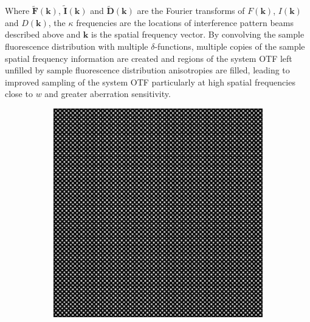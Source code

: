 Where $\tilde{\textbf{F}}(\textbf{k})$, $\tilde{\textbf{I}}(\textbf{k})$ and 
$\tilde{\textbf{D}}(\textbf{k})$ are the Fourier transforms of $F(\textbf{k})$, 
$I(\textbf{k})$ and $D(\textbf{k})$, the $\kappa$ frequencies are the 
locations of interference pattern beams described above and $\textbf{k}$ is 
the spatial frequency vector. By convolving the sample fluorescence 
distribution with  multiple $\delta$-functions, multiple copies of the 
sample spatial frequency information are created and regions of the 
system OTF left  unfilled by sample fluorescence distribution anisotropies 
are filled, leading to  improved sampling of the system OTF particularly 
at high spatial frequencies close to $w$ and greater aberration 
sensitivity.\cite{vzurauskas2019isosense}

\begin{figure}[h]
	\centering
	\begin{subfigure}{0.4\textwidth}
		\centering
		\includegraphics[width=1\linewidth, scale=0.5]{./images/isosense_visualisation_real.png}
		\caption{}
		\label{fig:isosense_visualisation_real}
	\end{subfigure}
	\begin{subfigure}{0.4\textwidth}
		\centering

\end{subfigure}
\end{figure}
